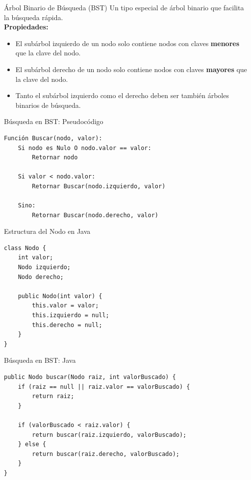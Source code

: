 \documentclass{beamer}
\begin{document}
\begin{frame}{Árbol Binario de Búsqueda (BST)}
  Un tipo especial de árbol binario que facilita la búsqueda rápida.
  \vspace{0.3cm}\\
  \textbf{Propiedades:}
  \begin{itemize}
      \item El subárbol izquierdo de un nodo solo contiene nodos con claves \textbf{menores} que la clave del nodo.
      \item El subárbol derecho de un nodo solo contiene nodos con claves \textbf{mayores} que la clave del nodo.
      \item Tanto el subárbol izquierdo como el derecho deben ser también árboles binarios de búsqueda.
  \end{itemize}
\end{frame}

\begin{frame}[fragile]{Búsqueda en BST: Pseudocódigo}
\begin{verbatim}
Función Buscar(nodo, valor):
    Si nodo es Nulo O nodo.valor == valor:
        Retornar nodo
    
    Si valor < nodo.valor:
        Retornar Buscar(nodo.izquierdo, valor)
    
    Sino:
        Retornar Buscar(nodo.derecho, valor)
\end{verbatim}
\end{frame}

\begin{frame}[fragile]{Estructura del Nodo en Java}
\begin{lstlisting}
class Nodo {
    int valor;
    Nodo izquierdo;
    Nodo derecho;

    public Nodo(int valor) {
        this.valor = valor;
        this.izquierdo = null;
        this.derecho = null;
    }
}
\end{lstlisting}
\end{frame}

\begin{frame}[fragile]{Búsqueda en BST: Java}
\begin{lstlisting}
public Nodo buscar(Nodo raiz, int valorBuscado) {
    if (raiz == null || raiz.valor == valorBuscado) {
        return raiz;
    }

    if (valorBuscado < raiz.valor) {
        return buscar(raiz.izquierdo, valorBuscado);
    } else {
        return buscar(raiz.derecho, valorBuscado);
    }
}
\end{lstlisting}
\end{frame}
\end{document}
